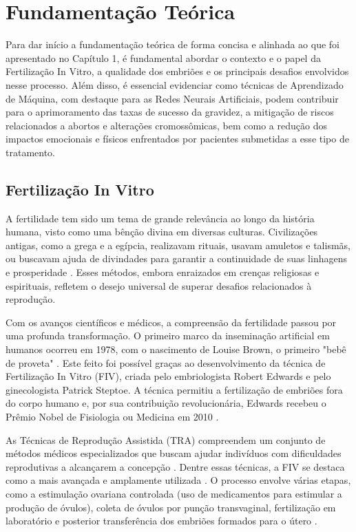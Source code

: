 \chapter[Fundamentação Teórica]{Fundamentação Teórica}

Para dar início a fundamentação teórica de forma concisa e alinhada ao que foi apresentado no Capítulo 1, é fundamental abordar o contexto e o papel da Fertilização In Vitro, a qualidade dos embriões e os principais desafios envolvidos nesse processo. Além disso, é essencial evidenciar como técnicas de Aprendizado de Máquina, com destaque para as Redes Neurais Artificiais, podem contribuir para o aprimoramento das taxas de sucesso da gravidez, a mitigação de riscos relacionados a abortos e alterações cromossômicas, bem como a redução dos impactos emocionais e físicos enfrentados por pacientes submetidas a esse tipo de tratamento.

\section{Fertilização In Vitro}

A fertilidade tem sido um tema de grande relevância ao longo da história humana, visto como uma bênção divina em diversas culturas. Civilizações antigas, como a grega e a egípcia, realizavam rituais, usavam amuletos e talismãs, ou buscavam ajuda de divindades para garantir a continuidade de suas linhagens e prosperidade \cite{moura2020}. Esses métodos, embora enraizados em crenças religiosas e espirituais, refletem o desejo universal de superar desafios relacionados à reprodução.

Com os avanços científicos e médicos, a compreensão da fertilidade passou por uma profunda transformação. O primeiro marco da inseminação artificial em humanos ocorreu em 1978, com o nascimento de Louise Brown, o primeiro "bebê de proveta" \cite{moura2020}. Este feito foi possível graças ao desenvolvimento da técnica de Fertilização In Vitro (FIV), criada pelo embriologista Robert Edwards e pelo ginecologista Patrick Steptoe. A técnica permitiu a fertilização de embriões fora do corpo humano e, por sua contribuição revolucionária, Edwards recebeu o Prêmio Nobel de Fisiologia ou Medicina em 2010 \cite{corleta2010}.

As Técnicas de Reprodução Assistida (TRA) compreendem um conjunto de métodos médicos especializados que buscam ajudar indivíduos com dificuldades reprodutivas a alcançarem a concepção \cite{souzamarise2024}. Dentre essas técnicas, a FIV se destaca como a mais avançada e amplamente utilizada \cite{moura2020}. O processo envolve várias etapas, como a estimulação ovariana controlada (uso de medicamentos para estimular a produção de óvulos), coleta de óvulos por punção transvaginal, fertilização em laboratório e posterior transferência dos embriões formados para o útero \cite{moura2020}.


